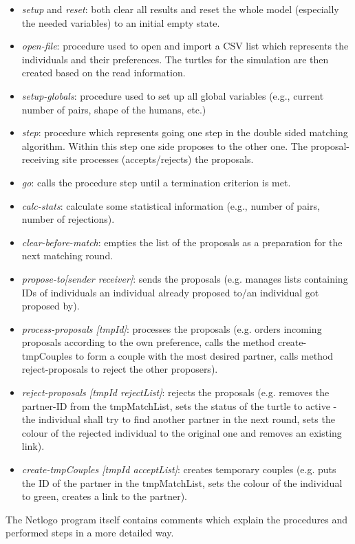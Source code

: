 \begin{itemize}
	\item \textit{setup} and \textit{reset}: both clear all results and reset the whole model (especially the needed variables) to an initial empty state. 
	\item \textit{open-file}: procedure used to open and import a CSV list which represents the individuals and their preferences. The turtles for the simulation are then created based on the read information.
	\item \textit{setup-globals}: procedure used to set up all global variables (e.g., current number of pairs, shape of the humans, etc.)
	\item \textit{step}: procedure which represents going one step in the double sided matching algorithm. Within this step one side proposes to the other one. The proposal-receiving site processes (accepts/rejects) the proposals.
	\item \textit{go}: calls the procedure step until a termination criterion is met.
	\item \textit{calc-stats}: calculate some statistical information (e.g., number of pairs, number of rejections).
	\item \textit{clear-before-match}: empties the list of the proposals as a preparation for the next matching round.
	\item \textit{propose-to[sender receiver]}: sends the proposals (e.g. manages lists containing IDs of individuals an individual already proposed to/an individual got proposed by).
	\item \textit{process-proposals [tmpId]}: processes the proposals (e.g. orders incoming proposals according to the own preference, calls the method create-tmpCouples to form a couple with the most desired partner, calls method reject-proposals to reject the other proposers).
	\item \textit{reject-proposals [tmpId rejectList]}: rejects the proposals (e.g. removes the partner-ID from the tmpMatchList, sets the status of the turtle to active - the individual shall try to find another partner in the next round, sets the colour of the rejected individual to the original one and removes an existing link).
	\item \textit{create-tmpCouples [tmpId acceptList]}: creates temporary couples (e.g. puts the ID of the partner in the tmpMatchList, sets the colour of the individual to green, creates a link to the partner).
\end{itemize}
The Netlogo program itself contains comments which explain the procedures and performed steps in a more detailed way.

